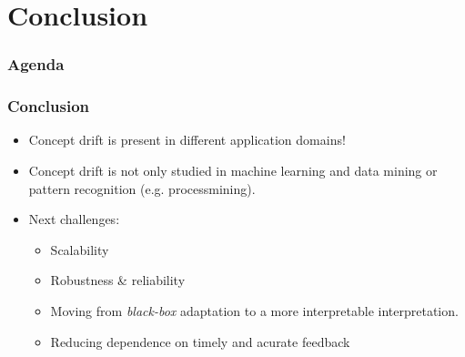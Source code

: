 \section{Conclusion}

\begin{frame}
\frametitle{Agenda}
\tableofcontents[currentsection]
\end{frame}


\begin{frame}
\frametitle{Conclusion}

\begin{itemize}
\item Concept drift is present in different application domains!
\item Concept drift is not only studied in machine learning and data mining or pattern recognition (e.g. processmining).
\item Next challenges:
	\begin{itemize}
	\item Scalability
	\item Robustness \& reliability
	\item Moving from \textit{black-box} adaptation to a more interpretable interpretation.
	\item Reducing dependence on timely and acurate feedback
	\end{itemize}
\end{itemize}
\end{frame}